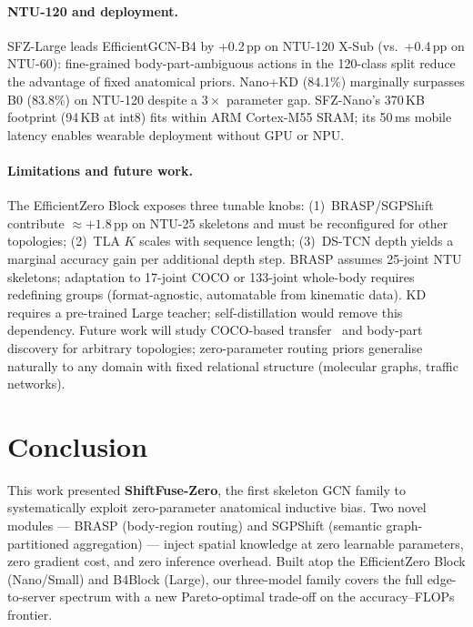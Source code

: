 \documentclass[sigconf,screen,review,anonymous]{acmart}
\begin{document}
\paragraph{NTU-120 and deployment.}
SFZ-Large leads EfficientGCN-B4 by +0.2\,pp on NTU-120 X-Sub (vs.\ +0.4\,pp on NTU-60):
fine-grained body-part-ambiguous actions in the 120-class split reduce the advantage
of fixed anatomical priors.
Nano+KD (84.1\%) marginally surpasses B0 (83.8\%) on NTU-120 despite a $3{\times}$ parameter gap.
SFZ-Nano's 370\,KB footprint (94\,KB at int8) fits within ARM Cortex-M55 SRAM;
its 50\,ms mobile latency enables wearable deployment without GPU or NPU.

\paragraph{Limitations and future work.}
The EfficientZero Block exposes three tunable knobs: (1)~BRASP/SGPShift
contribute ${\approx}{+}1.8$\,pp on NTU-25 skeletons and must be reconfigured
for other topologies; (2)~TLA $K$ scales with sequence length;
(3)~DS-TCN depth yields a marginal accuracy gain per additional depth step.
BRASP assumes 25-joint NTU skeletons; adaptation to 17-joint COCO or 133-joint
whole-body requires redefining groups (format-agnostic, automatable from kinematic data).
KD requires a pre-trained Large teacher; self-distillation would remove this dependency.
Future work will study COCO-based transfer~\cite{posec3d} and body-part discovery for
arbitrary topologies; zero-parameter routing priors generalise naturally to any
domain with fixed relational structure (molecular graphs, traffic networks).

\section{Conclusion}\label{sec:conc}

This work presented \textbf{ShiftFuse-Zero}, the first skeleton GCN family to
systematically exploit zero-parameter anatomical inductive bias.
Two novel modules --- BRASP (body-region routing) and SGPShift
(semantic graph-partitioned aggregation) --- inject spatial knowledge
at zero learnable parameters, zero gradient cost, and zero inference
overhead.
Built atop the EfficientZero Block (Nano/Small) and B4Block (Large),
our three-model family covers the full edge-to-server spectrum with
a new Pareto-optimal trade-off on the accuracy--FLOPs frontier.
\end{document}
